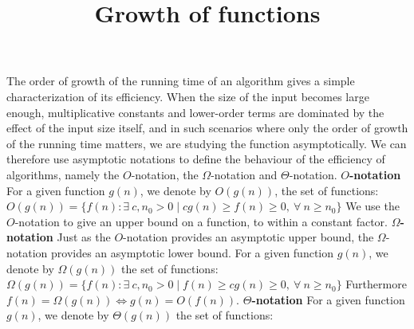 \documentclass[12pt]{article}
\title{\vspace{-1.0cm}Growth of functions}
\date{}
\begin{document}
\maketitle
\vspace{-2.0cm}
The order of growth of the running time of an algorithm gives a simple characterization of its efficiency. \newline
\hspace*{5mm} When the size of the input becomes large enough, multiplicative constants and lower-order terms are
dominated by the effect of the input size itself, and in such scenarios where only the order of growth of the running
time matters, we are studying the function asymptotically. \newline
\hspace*{5mm} We can therefore use asymptotic notations to define the behaviour of the efficiency of algorithms,
namely the $O$-notation, the $\Omega$-notation and $\Theta$-notation. \newline
\newline
\textbf{$O$-notation} \newline
For a given function $g(n)$, we denote by $O(g(n))$, the set of functions:\vspace{5mm} \newline
$O(g(n)) = \{f(n) : \exists \ c, n_0 > 0 \mid cg(n) \geq f(n) \geq 0, \ \forall \ n \geq n_0\}$ \vspace{5mm} \newline
We use the $O$-notation to give an upper bound on a function, to within a constant factor. \newline \newline
\textbf{$\Omega$-notation} \newline
Just as the $O$-notation provides an asymptotic upper bound, the $\Omega$-notation provides an asymptotic lower bound.
For a given function $g(n)$, we denote by $\Omega(g(n))$ the set of functions: \newline \newline
$\Omega(g(n)) = \{f(n) : \exists \ c, n_0 > 0 \mid f(n) \geq cg(n) \geq 0, \ \forall \ n \geq n_0\}$ \newline \newline
Furthermore $f(n) = \Omega(g(n)) \iff g(n) = O(f(n)).$ \newline \newline
\textbf{$\Theta$-notation} \newline
For a given function $g(n)$, we denote by $\Theta(g(n))$ the set of functions: \newline \newline
\end{document}
